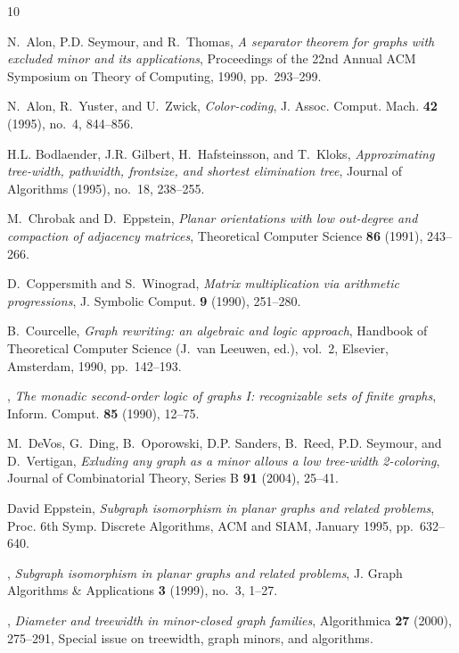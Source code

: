 \documentclass[a4paper]{amsart}
\theoremstyle{definition}
\theoremstyle{remark}
\begin{document}
\begin{thebibliography}{10}

N.~Alon, P.D. Seymour, and R.~Thomas, \emph{A separator theorem for graphs with
  excluded minor and its applications}, Proceedings of the 22nd Annual ACM
  Symposium on Theory of Computing, 1990, pp.~293--299.

N.~Alon, R.~Yuster, and U.~Zwick, \emph{Color-coding}, J. Assoc. Comput. Mach.
  \textbf{42} (1995), no.~4, 844--856.

H.L. Bodlaender, J.R. Gilbert, H.~Hafsteinsson, and T.~Kloks,
  \emph{Approximating tree-width, pathwidth, frontsize, and shortest
  elimination tree}, Journal of Algorithms (1995), no.~18, 238--255.

M.~Chrobak and D.~Eppstein, \emph{Planar orientations with low out-degree and
  compaction of adjacency matrices}, Theoretical Computer Science \textbf{86}
  (1991), 243--266.

D.~Coppersmith and S.~Winograd, \emph{Matrix multiplication via arithmetic
  progressions}, J. Symbolic Comput. \textbf{9} (1990), 251--280.

B.~Courcelle, \emph{Graph rewriting: an algebraic and logic approach}, Handbook
  of {T}heoretical {C}omputer {S}cience (J.~van Leeuwen, ed.), vol.~2,
  Elsevier, Amsterdam, 1990, pp.~142--193.

\bysame, \emph{The monadic second-order logic of graphs {I}: recognizable sets
  of finite graphs}, Inform. Comput. \textbf{85} (1990), 12--75.

M.~DeVos, G.~Ding, B.~Oporowski, D.P. Sanders, B.~Reed, P.D. Seymour, and
  D.~Vertigan, \emph{Exluding any graph as a minor allows a low tree-width
  2-coloring}, Journal of Combinatorial Theory, Series B \textbf{91} (2004),
  25--41.

David Eppstein, \emph{{Subgraph isomorphism in planar graphs and related
  problems}}, Proc. 6th Symp. Discrete Algorithms, ACM and SIAM, January 1995,
  pp.~632--640.

\bysame, \emph{{Subgraph isomorphism in planar graphs and related problems}},
  J. Graph Algorithms {\&} Applications \textbf{3} (1999), no.~3, 1--27.

\bysame, \emph{{Diameter and treewidth in minor-closed graph families}},
  Algorithmica \textbf{27} (2000), 275--291, Special issue on treewidth, graph
  minors, and algorithms.


\end{thebibliography}
\end{document}
